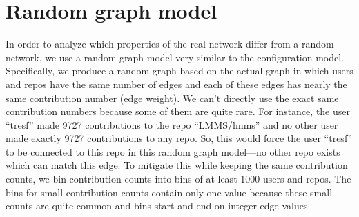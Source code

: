 \documentclass{pset}
\begin{document}


\section*{Random graph model}

In order to analyze which properties of the real network differ from a random
network, we use a random graph model very similar to the configuration model.
Specifically, we produce a random graph based on the actual
graph in which users and repos have the same
number of edges and each of these edges has nearly the same contribution number
(edge weight). We can't directly use the exact same contribution numbers
because some of them are quite rare. For instance, the user ``tresf'' made 9727
contributions to the repo ``LMMS/lmms'' and no other user made exactly 9727
contributions to any repo.  So, this would force the user ``tresf'' to be
connected to this repo in this random graph model---no other repo exists which
can match this edge.  To mitigate this while keeping the same contribution
counts, we bin contribution counts into bins of at least 1000 users and repos.
The bins for small contribution counts contain only one value because these
small counts are quite common and bins start and end on integer edge values.
\end{document}
